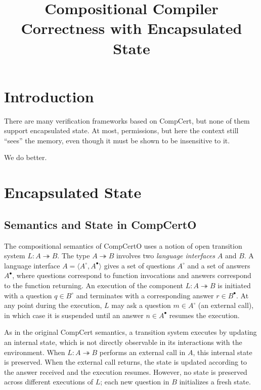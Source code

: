 \documentclass[acmsmall,screen,review,anonymous]{acmart}
\title{Compositional Compiler Correctness with Encapsulated State}
\newcommand{\que}{\circ}
\newcommand{\ans}{\bullet}
\begin{document}
\maketitle

\section{Introduction} %

There are many verification frameworks based on CompCert,
but none of them support encapsulated state.
At most, permissions,
but here the context still ``sees'' the memory,
even though it must be shown to be insensitive to it.

We do better.


\section{Encapsulated State} %

\subsection{Semantics and State in CompCertO} %

The compositional semantics of CompCertO uses %
a notion of open transition system $L : A \twoheadrightarrow B$.
The type $A \twoheadrightarrow B$ involves
two \emph{language interfaces} $A$ and $B$.
A language interface $A = \langle A^\que, A^\ans \rangle$
gives a set of questions $A^\que$ and a set of answers $A^\ans$,
where questions correspond to function invocations
and answers correspond to the function returning.
An execution of the component $L : A \twoheadrightarrow B$
is initiated with a question $q \in B^\que$
and terminates with a corresponding answer $r \in B^\ans$.
At any point during the execution,
$L$ may ask a question $m \in A^\que$ (an external call),
in which case it is suspended until an answer $n \in A^\ans$
resumes the execution.

As in the original CompCert semantics,
a transition system
executes by updating an internal state,
which is not directly observable 
in its interactions with the environment.
When $L : A \twoheadrightarrow B$
performs an external call in $A$,
this internal state is preserved.
When the external call returns,
the state is updated according to the answer received
and the execution resumes.
However,
no state is preserved across different executions of $L$;
each new question in $B$ initializes a fresh state.
\end{document}
